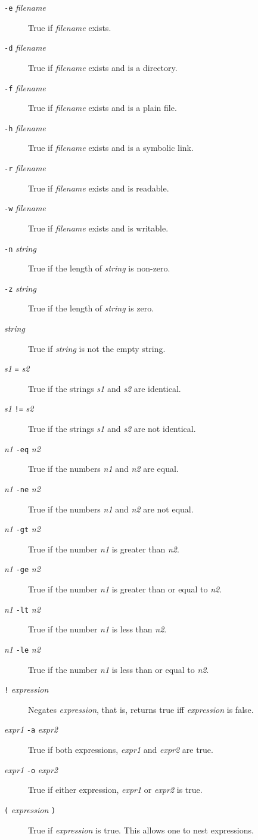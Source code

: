 \documentclass{article}
\newcommand{\code}[1]{\texttt{#1}}
\begin{document}
\begin{description}
\item[\code{-e} \textit{filename}]
	True if \textit{filename} exists.
\item[\code{-d} \textit{filename}]
	True if \textit{filename} exists and is a directory.
\item[\code{-f} \textit{filename}]
	True if \textit{filename} exists and is a plain file.
\item[\code{-h} \textit{filename}]
	True if \textit{filename} exists and is a symbolic link.
\item[\code{-r} \textit{filename}]
	True if \textit{filename} exists and is readable.
\item[\code{-w} \textit{filename}]
	True if \textit{filename} exists and is writable.
\item[\code{-n} \textit{string}]
	True if the length of \textit{string} is non-zero.
\item[\code{-z} \textit{string}]
	True if the length of \textit{string} is zero.
\item[\textit{string}]
	True if \textit{string} is not the empty string.
\item[\textit{s1} \code{=} \textit{s2}]
	True if the strings \textit{s1} and \textit{s2} are identical.
\item[\textit{s1} \code{!=} \textit{s2}]
	True if the strings \textit{s1} and \textit{s2} are not
	identical.
\item[\textit{n1} \code{-eq} \textit{n2}]
	True if the numbers \textit{n1} and \textit{n2} are equal.
\item[\textit{n1} \code{-ne} \textit{n2}]
	True if the numbers \textit{n1} and \textit{n2} are not equal.
\item[\textit{n1} \code{-gt} \textit{n2}]
	True if the number \textit{n1} is greater than \textit{n2}.
\item[\textit{n1} \code{-ge} \textit{n2}]
	True if the number \textit{n1} is greater than or equal to
	\textit{n2}.
\item[\textit{n1} \code{-lt} \textit{n2}]
	True if the number \textit{n1} is less than \textit{n2}.
\item[\textit{n1} \code{-le} \textit{n2}]
	True if the number \textit{n1} is less than or equal to
	\textit{n2}.
\item[\code{!} \textit{expression}]
	Negates \textit{expression}, that is, returns true iff
	\textit{expression} is false.
\item[\textit{expr1} \code{-a} \textit{expr2}]
	True if both expressions, \textit{expr1} and \textit{expr2}
	are true.
\item[\textit{expr1} \code{-o} \textit{expr2}]
	True if either expression, \textit{expr1} or \textit{expr2} is
	true.
\item[\code{(} \textit{expression} \code{)}]
	True if \textit{expression} is true. This allows one to nest
	expressions.
\end{description}
\end{document}
